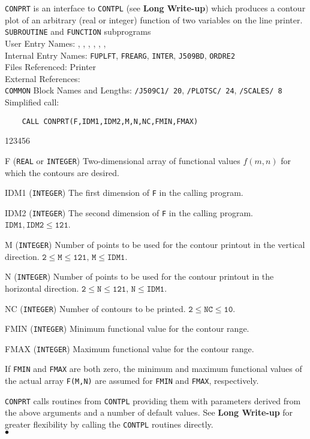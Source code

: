                        
                    
\Submitter{}                             
                        
{\tt CONPRT} is an interface to {\tt CONTPL} (see {\bf Long Write-up})
which
produces a contour plot of an arbitrary (real or integer) function
of two variables on the line printer.
\Structure
{\tt SUBROUTINE} and {\tt FUNCTION} subprograms \\
User Entry Names: , , ,
, , ,  \\
Internal Entry Names: {\tt FUPLFT}, {\tt FREARG}, {\tt INTER},
{\tt J509BD}, {\tt ORDRE2}\\
Files Referenced: Printer\\
External References:  \\
{\tt COMMON} Block Names and Lengths: {\tt /J509C1/ 20},
{\tt /PLOTSC/ 24}, {\tt /SCALES/ 8}
\Usage
Simplified call:
\begin{verbatim}
    CALL CONPRT(F,IDM1,IDM2,M,N,NC,FMIN,FMAX)
\end{verbatim}
\begin{DLtt}{123456}
\item [F] ({\tt REAL} or {\tt INTEGER}) Two-dimensional array of
functional values $f(m,n)$ for which the contours are desired.
\item [IDM1] ({\tt INTEGER}) The first dimension of {\tt F} in
the calling program.
\item [IDM2] ({\tt INTEGER}) The second dimension of {\tt F} in
the calling program. $\mathtt{IDM1,IDM2 \leq 121}$.
\item [M] ({\tt INTEGER}) Number of points to be used for the contour
printout in the vertical direction.
$\mathtt{2 \leq M \leq 121,\,M \leq IDM1}$.
\item [N] ({\tt INTEGER}) Number of points to be used for the contour
printout in the horizontal direction.
$\mathtt{2 \leq N \leq 121,\,N \leq IDM1}$.
\item [NC] ({\tt INTEGER}) Number of contours to be printed.
$\mathtt{2 \leq NC \leq 10}$.
\item [FMIN] ({\tt INTEGER}) Minimum functional value for the contour
range.
\item [FMAX] ({\tt INTEGER}) Maximum functional value for the contour
range.
\item[] If {\tt FMIN} and {\tt FMAX} are both zero, the minimum and
maximum functional values of the actual array {\tt F(M,N)} are
assumed for {\tt FMIN} and {\tt FMAX}, respectively.
\end{DLtt}
\Notes
{\tt CONPRT} calls routines from {\tt CONTPL} providing them with
parameters derived from the above arguments and a number of default
values. See {\bf Long Write-up} for greater flexibility by calling the
{\tt CONTPL} routines directly.
\\ $\bullet$
